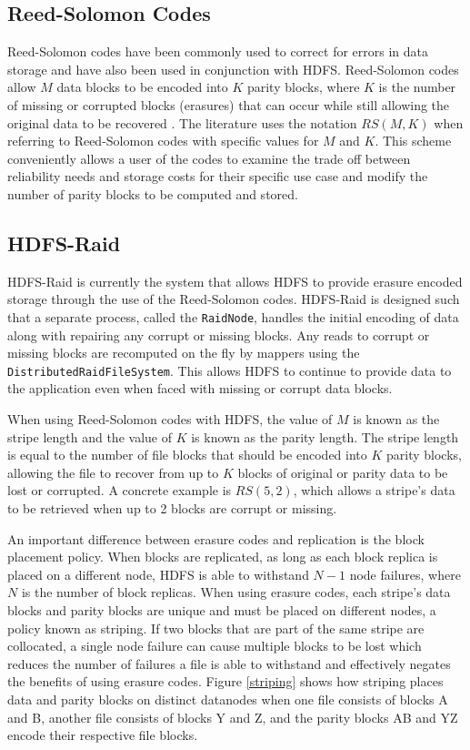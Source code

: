 \documentclass{ucetd}
\newcommand{\code}[1]{\texttt{#1}}
\begin{document}
    \subsection{Reed-Solomon Codes}

Reed-Solomon codes have been commonly used to correct for errors in data storage
and have also been used in conjunction with HDFS. Reed-Solomon codes allow $M$
data blocks to be encoded into $K$ parity blocks, where $K$ is the number of
missing or corrupted blocks (erasures) that can occur while still allowing the
original data to be recovered \cite{Reed}. The literature uses the notation
$RS(M,K)$ when referring to Reed-Solomon codes with specific values for $M$ and
$K$.  This scheme conveniently allows a user of the codes to examine the trade
off between reliability needs and storage costs for their specific use case and
modify the number of parity blocks to be computed and stored.

    \subsection{HDFS-Raid}

HDFS-Raid \cite{HDFS-Raid} is currently the system that allows HDFS to provide
erasure encoded storage through the use of the Reed-Solomon codes. HDFS-Raid is
designed such that a separate process, called the \code{RaidNode}, handles the
initial encoding of data along with repairing any corrupt or missing blocks. Any
reads to corrupt or missing blocks are recomputed on the fly by mappers using
the \code{DistributedRaidFileSystem}.  This allows HDFS to continue to provide
data to the application even when faced with missing or corrupt data blocks.

When using Reed-Solomon codes with HDFS, the value of $M$ is known as the
stripe length and the value of $K$ is known as the parity length. The stripe
length is equal to the number of file blocks that should be encoded into $K$
parity blocks, allowing the file to recover from up to $K$ blocks of original or
parity data to be lost or corrupted. A concrete example is $RS(5,2)$, which
allows a stripe's data to be retrieved when up to 2 blocks are corrupt or missing.

An important difference between erasure codes and replication is the block
placement policy. When blocks are replicated, as long as each block replica is
placed on a different node, HDFS is able to withstand $N - 1$ node failures,
where $N$ is the number of block replicas. When using erasure codes, each
stripe's data blocks and parity blocks are unique and must be placed on
different nodes, a policy known as striping. If two blocks that are part of the
same stripe are collocated, a single node failure can cause multiple blocks to
be lost which reduces the number of failures a file is able to withstand and
effectively negates the benefits of using erasure codes. Figure \ref{striping}
shows how striping places data and parity blocks on distinct datanodes when one
file consists of blocks A and B, another file consists of blocks Y and Z, and
the parity blocks AB and YZ encode their respective file blocks.
\end{document}
